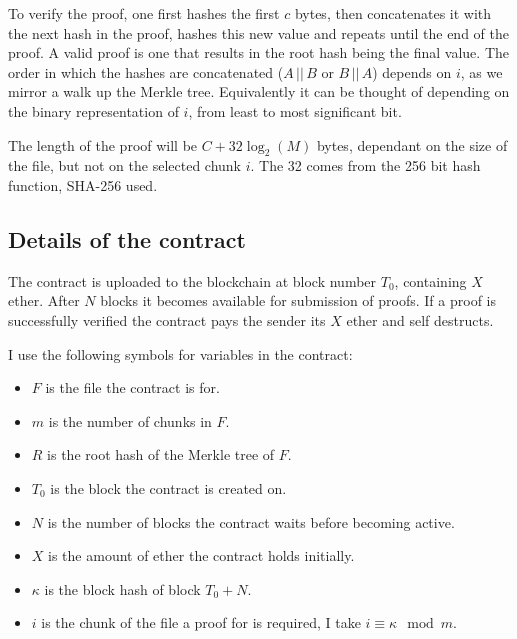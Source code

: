 \documentclass[12pt,a4paper,twoside,openright]{report}
\begin{document}
To verify the proof, one first hashes the first $c$ bytes, then concatenates it with the next hash in the proof,
hashes this new value and repeats until the end of the proof.
A valid proof is one that results in the root hash being the final value.
The order in which the hashes are concatenated ($A \,||\, B$ or $B \, || \, A$) depends on $i$, as we mirror a walk up the Merkle tree.
Equivalently it can be thought of depending on the binary representation of $i$, from least to most significant bit.

The length of the proof will be $C + 32 \log_2(M)$ bytes, dependant on the size of the file, but not on the selected chunk $i$.
The 32 comes from the 256 bit hash function, SHA-256 used.

%
%




\subsection{Details of the contract}
\label{contract-plan}

The contract is uploaded to the blockchain at block number $T_0$, containing $X$ ether.
After $N$ blocks it becomes available for submission of proofs.
If a proof is successfully verified the contract pays the sender its $X$ ether and self destructs.

I use the following symbols for variables in the contract:

\begin{itemize}
\item $F$ is the file the contract is for.
\item $m$ is the number of chunks in $F$.
\item $R$ is the root hash of the Merkle tree of $F$.
\item $T_0$ is the block the contract is created on.
\item $N$ is the number of blocks the contract waits before becoming active.
\item $X$ is the amount of ether the contract holds initially.
\item $\kappa$ is the block hash of block $T_0 + N$.
\item $i$ is the chunk of the file a proof for is required, I take $i \equiv \kappa \mod m$.
\end{itemize}
\end{document}
